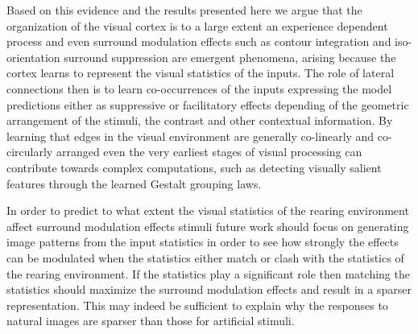 Based on this evidence and the results presented here we argue that
the organization of the visual cortex is to a large extent an
experience dependent process and even surround modulation effects such
as contour integration and iso-orientation surround suppression are
emergent phenomena, arising because the cortex learns to represent the
visual statistics of the inputs. The role of lateral connections then
is to learn co-occurrences of the inputs expressing the model
predictions either as suppressive or facilitatory effects depending of
the geometric arrangement of the stimuli, the contrast and other
contextual information. By learning that edges in the visual
environment are generally co-linearly and co-circularly arranged even
the very earliest stages of visual processing can contribute towards
complex computations, such as detecting visually salient features
through the learned Gestalt grouping laws.

In order to predict to what extent the visual statistics of the
rearing environment affect surround modulation effects stimuli future
work should focus on generating image patterns from the input
statistics in order to see how strongly the effects can be modulated
when the statistics either match or clash with the statistics of the
rearing environment. If the statistics play a significant role then
matching the statistics should maximize the surround modulation
effects and result in a sparser representation. This may indeed be
sufficient to explain why the responses to natural images are sparser
than those for artificial stimuli.

